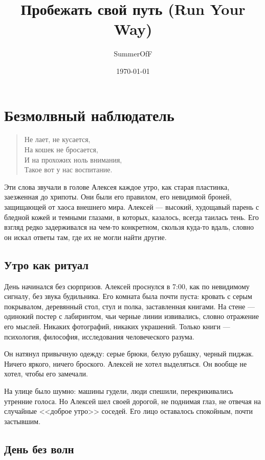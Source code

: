 \documentclass[12pt,a4paper]{book}
\title{Пробежать свой путь (Run Your Way)}
\author{SummerOfF}
\date{\today}
\begin{document}
\maketitle
\tableofcontents

\chapter{Безмолвный наблюдатель}

\begin{verse}
Не лает, не кусается,\\
На кошек не бросается,\\
И на прохожих ноль внимания,\\
Такое вот у нас воспитание.
\end{verse}

Эти слова звучали в голове Алексея каждое утро, как старая пластинка, заезженная до хрипоты. Они были его правилом, его невидимой броней, защищающей от хаоса внешнего мира. Алексей --- высокий, худощавый парень с бледной кожей и темными глазами, в которых, казалось, всегда таилась тень. Его взгляд редко задерживался на чем-то конкретном, скользя куда-то вдаль, словно он искал ответы там, где их не могли найти другие.

\section{Утро как ритуал}

День начинался без сюрпризов. Алексей проснулся в 7:00, как по невидимому сигналу, без звука будильника. Его комната была почти пуста: кровать с серым покрывалом, деревянный стол, стул и полка, заставленная книгами. На стене --- одинокий постер с лабиринтом, чьи черные линии извивались, словно отражение его мыслей. Никаких фотографий, никаких украшений. Только книги --- психология, философия, исследования человеческого разума.

Он натянул привычную одежду: серые брюки, белую рубашку, черный пиджак. Ничего яркого, ничего броского. Алексей не хотел выделяться. Он вообще не хотел, чтобы его замечали.

На улице было шумно: машины гудели, люди спешили, перекрикивались утренние голоса. Но Алексей шел своей дорогой, не поднимая глаз, не отвечая на случайные <<доброе утро>> соседей. Его лицо оставалось спокойным, почти застывшим.

\section{День без волн}
\end{document}
